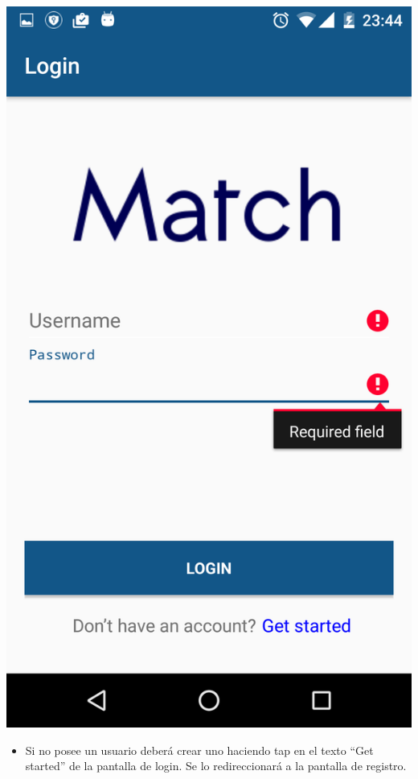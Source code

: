 \documentclass[letterpaper,10pt,english]{sphinxmanual}
\begin{document}
\includegraphics{login_failed.png}
\begin{itemize}
\item {} 
Si no posee un usuario deberá crear uno haciendo tap en el texto “Get started” de la pantalla de login. Se lo redireccionará a la pantalla de registro.

\end{itemize}
\end{document}
